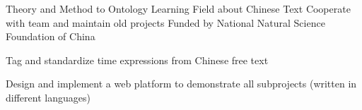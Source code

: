 {Theory and Method to Ontology Learning Field about Chinese Text}
{Cooperate with team and maintain old projects}
{Funded by National Natural Science Foundation of China}
{}
{
  \begin{tightitemize}
      \item Tag and standardize time expressions from Chinese free text
      \item Design and implement a web platform to demonstrate all subprojects (written in different languages)
  \end{tightitemize}
}
